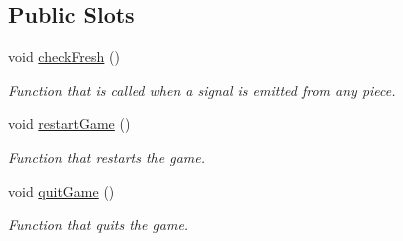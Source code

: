 \subsection*{Public Slots}
\begin{DoxyCompactItemize}
\item 
void \hyperlink{classgame2scene_a9ff06546f203c57909aaeb36063fc206}{check\+Fresh} ()
\begin{DoxyCompactList}\small\item\em Function that is called when a signal is emitted from any piece. \end{DoxyCompactList}\item 
void \hyperlink{classgame2scene_a8b3ee51f004d034df994bd602a31ec5b}{restart\+Game} ()
\begin{DoxyCompactList}\small\item\em Function that restarts the game. \end{DoxyCompactList}\item 
void \hyperlink{classgame2scene_ab8f07d5d6dacd32de1ff442ee29f45d3}{quit\+Game} ()
\begin{DoxyCompactList}\small\item\em Function that quits the game. \end{DoxyCompactList}\end{DoxyCompactItemize}
